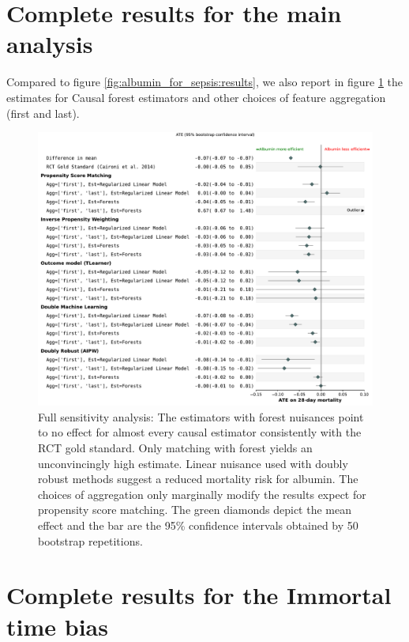 \documentclass[french,12pt,twoside,a4paper]{book}
\begin{document}
\begin{appendices}
  \section{Complete results for the main analysis}\label{apd:detailed_results}

  Compared to figure \ref{fig:albumin_for_sepsis:results}, we also report in
  figure \ref{apd:fig:detailed_results} the estimates for Causal forest
  estimators and other choices of feature aggregation (first and last).
  \begin{figure}[h!]
    \centering
    \includegraphics[width=\linewidth]{img/chapter_4/albumin_for_sepsis__obs_1d__estimates_20230712__est_lr_rf__bs_50_supplementary.pdf}
    \caption{Full sensitivity analysis: The estimators with forest nuisances
      point to no effect for almost every causal estimator consistently with the
      RCT gold standard. Only matching with forest yields an unconvincingly high
      estimate. Linear nuisance used with doubly robust methods suggest a
      reduced mortality risk for albumin. The choices of aggregation only
      marginally modify the results expect for propensity score matching. The
      green diamonds depict the mean effect and the bar are the 95\% confidence
      intervals obtained by 50 bootstrap
      repetitions.}\label{apd:fig:detailed_results}
  \end{figure}

  \section{Complete results for the Immortal time bias}\label{apd:detailed_results_itb}


\end{appendices}
\end{document}
